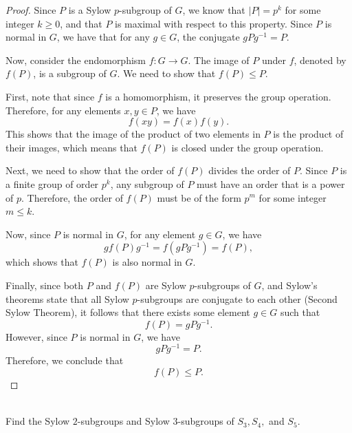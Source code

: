 \documentclass{article}
\begin{document}
\begin{proof}
    Since $P$ is a Sylow $p$-subgroup of $G$, we know that $|P| = p^k$ for some integer $k \geq 0$, and that $P$ is maximal with respect to this property. Since $P$ is normal in $G$, we have that for any $g \in G$, the conjugate $gPg^{-1} = P$. 

    Now, consider the endomorphism $f: G \to G$. The image of $P$ under $f$, denoted by $f(P)$, is a subgroup of $G$. We need to show that $f(P) \leq P$. 

    First, note that since $f$ is a homomorphism, it preserves the group operation. Therefore, for any elements $x, y \in P$, we have
    \[
        f(xy) = f(x)f(y).
    \]
    This shows that the image of the product of two elements in $P$ is the product of their images, which means that $f(P)$ is closed under the group operation.

    Next, we need to show that the order of $f(P)$ divides the order of $P$. Since $P$ is a finite group of order $p^k$, any subgroup of $P$ must have an order that is a power of $p$. Therefore, the order of $f(P)$ must be of the form $p^m$ for some integer $m \leq k$. 

    Now, since $P$ is normal in $G$, for any element $g \in G$, we have
    \[
        g f(P) g^{-1} = f(gPg^{-1}) = f(P),
    \]
    which shows that $f(P)$ is also normal in $G$. 

    Finally, since both $P$ and $f(P)$ are Sylow $p$-subgroups of $G$, and Sylow's theorems state that all Sylow $p$-subgroups are conjugate to each other (Second Sylow Theorem), it follows that there exists some element $g \in G$ such that
    \[
        f(P) = gPg^{-1}.
    \]
    However, since $P$ is normal in $G$, we have
    \[
        gPg^{-1} = P.
    \]
    Therefore, we conclude that
    \[
        f(P) \leq P.
    \]
\end{proof}


\begin{problem}[II.5.7] \\
    Find the Sylow $2$-subgroups and Sylow $3$-subgroups of $S_3, S_4,$ and $S_5$.
\end{problem}
\end{document}
